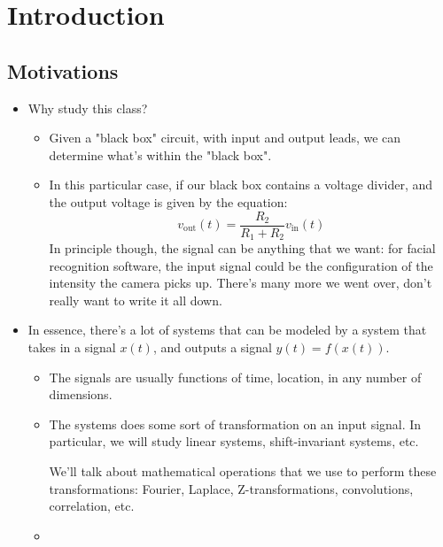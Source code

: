 \section{Introduction}
\subsection{Motivations} 
\begin{itemize}
	\item Why study this class?
		\begin{itemize}
			\item Given a "black box" circuit, with input and output leads, we can determine what's within 
				the "black 
				box".
			\item In this particular case, if our black box contains a voltage divider, and the output voltage is given 
				by the equation:
				\[
				v_{\text{out}}(t) = \frac{R_2}{R_1+ R_2}v_{\text{in}}(t)
				\] 
				In principle though, the signal can be anything that we want: for facial recognition software, the input
				signal could be the configuration of the intensity the camera picks up. There's many more we went over, 
				don't really want to write it all down. 
		\end{itemize}
	\item In essence, there's a lot of systems that can be modeled by a system that takes in a signal \( x(t) \), and 
		outputs a signal \( y(t) = f(x(t))\).
		\begin{itemize}
			\item The signals are usually functions of time, location, in any number of dimensions.
			\item The systems does some sort of transformation on an input signal. In particular, we will study 
				linear systems, shift-invariant systems, etc.
				
				We'll talk about mathematical operations that we use to perform these transformations: Fourier, 
				Laplace, Z-transformations, convolutions, correlation, etc.\item 
	\end{itemize}
\end{itemize}
